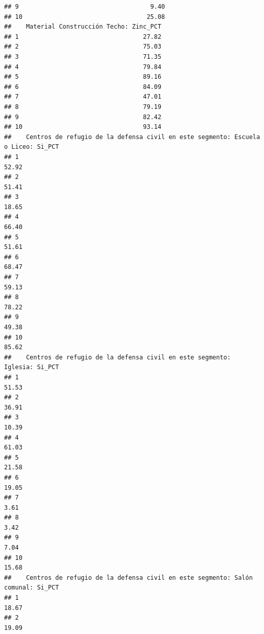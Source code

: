 \documentclass[11pt,]{article}
\begin{document}
\begin{verbatim}
## 9                                    9.40
## 10                                  25.08
##    Material Construcción Techo: Zinc_PCT
## 1                                  27.82
## 2                                  75.03
## 3                                  71.35
## 4                                  79.84
## 5                                  89.16
## 6                                  84.09
## 7                                  47.01
## 8                                  79.19
## 9                                  82.42
## 10                                 93.14
##    Centros de refugio de la defensa civil en este segmento: Escuela o Liceo: Si_PCT
## 1                                                                             52.92
## 2                                                                             51.41
## 3                                                                             18.65
## 4                                                                             66.40
## 5                                                                             51.61
## 6                                                                             68.47
## 7                                                                             59.13
## 8                                                                             78.22
## 9                                                                             49.38
## 10                                                                            85.62
##    Centros de refugio de la defensa civil en este segmento: Iglesia: Si_PCT
## 1                                                                     51.53
## 2                                                                     36.91
## 3                                                                     10.39
## 4                                                                     61.03
## 5                                                                     21.58
## 6                                                                     19.05
## 7                                                                      3.61
## 8                                                                      3.42
## 9                                                                      7.04
## 10                                                                    15.68
##    Centros de refugio de la defensa civil en este segmento: Salón comunal: Si_PCT
## 1                                                                           18.67
## 2                                                                           19.09

\end{verbatim}
\end{document}
